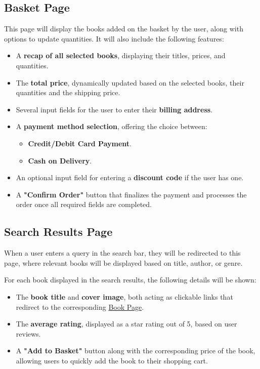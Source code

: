 \subsection{Basket Page} \label{sec:basket}
This page will display the books added on the basket by the user, along with options to update quantities. It will also include the following features:

\begin{itemize}
    \item A \textbf{recap of all selected books}, displaying their titles, prices, and quantities.
    \item The \textbf{total price}, dynamically updated based on the selected books, their quantities and the shipping price.
    \item Several input fields for the user to enter their \textbf{billing address}.
    \item A \textbf{payment method selection}, offering the choice between:
    \begin{itemize}
        \item \textbf{Credit/Debit Card Payment}.
        \item \textbf{Cash on Delivery}.
    \end{itemize}
    \item An optional input field for entering a \textbf{discount code} if the user has one.
    \item A \textbf{"Confirm Order"} button that finalizes the payment and processes the order once all required fields are completed.
\end{itemize}

\subsection{Search Results Page} \label{sec:search}
When a user enters a query in the search bar, they will be redirected to this page, where relevant books will be displayed based on title, author, or genre.

For each book displayed in the search results, the following details will be shown:
\begin{itemize}
    \item The \textbf{book title} and \textbf{cover image}, both acting as clickable links that redirect to the corresponding \hyperref[sec:book]{Book Page}.
    \item The \textbf{average rating}, displayed as a star rating out of 5, based on user reviews.
    \item A \textbf{"Add to Basket"} button along with the corresponding price of the book, allowing users to quickly add the book to their shopping cart.
\end{itemize}

